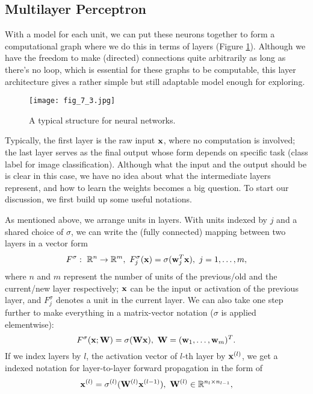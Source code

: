 \documentclass[../book-template.tex]{subfiles}
\begin{document}
\subsection{Multilayer Perceptron}
With a model for each unit, we can put these neurons together to form a computational graph where we do this in terms of layers (Figure \ref{fig_7_3}). Although we have the freedom to make (directed) connections quite arbitrarily as long as there's no loop, which is essential for these graphs to be computable, this layer architecture gives a rather simple but still adaptable model enough for exploring. 
\begin{figure}[h] 
	\centering 
	\texttt{[image: fig\_7\_3.jpg]} 
	\caption{A typical structure for neural networks.}\label{fig_7_3}
\end{figure}
\par Typically, the first layer is the raw input ${\bf x}$, where no computation is involved; the last layer serves as the final output whose form depends on specific task (class label for image classification). Although what the input and the output should be is clear in this case, we have no idea about what the intermediate layers represent, and how to learn the weights becomes a big question. To start our discussion, we first build up some useful notations.
\par As mentioned above, we arrange units in layers. With units indexed by $j$ and a shared choice of $\sigma$, we can write the (fully connected) mapping between two layers in a vector form
\begin{equation*}
	F^{\sigma}:\ \mathbb{R}^n\rightarrow \mathbb{R}^m,\ F^{\sigma}_{j}({\bf x})=\sigma({\bf w}_j^T{\bf x}),\ j=1,\dots,m,
\end{equation*}
where $n$ and $m$ represent the number of units of the previous/old and the current/new layer respectively; ${\bf x}$ can be the input or activation of the previous layer, and $ F^{\sigma}_{j}$ denotes a unit in the current layer. We can also take one step further to make everything in a matrix-vector notation ($\sigma$ is applied elementwise):
\begin{equation*}
	F^{\sigma}({\bf x};{\bf W})=\sigma({\bf Wx}),\ {\bf W}=({\bf w}_1,\dots, {\bf w}_m)^T.
\end{equation*}
If we index layers by $l$, the activation vector of $l$-th layer by ${\bf x}^{(l)}$, we get a indexed notation for layer-to-layer forward propagation in the form of
\begin{equation*}
	{\bf x}^{(l)}=\sigma^{(l)}({\bf W}^{(l)}{\bf x}^{(l-1)}),\ {\bf W}^{(l)}\in \mathbb{R}^{n_l\times n_{l-1}},
\end{equation*}
\end{document}
